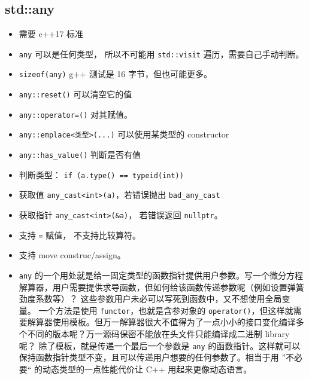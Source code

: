 \subsection{std::any}
\begin{itemize}
\item 需要 c++17 标准
\end{itemize}
\begin{itemize}
\item \verb|any| 可以是任何类型， 所以不可能用 \verb|std::visit| 遍历，需要自己手动判断。
\item \verb|sizeof(any)| g++ 测试是 16 字节，但也可能更多。
\item \verb|any::reset()| 可以清空它的值
\item \verb|any::operator=()| 对其赋值。
\item \verb|any::emplace<类型>(...)| 可以使用某类型的 constructor
\item \verb|any::has_value()| 判断是否有值
\item 判断类型： \verb|if (a.type() == typeid(int))|
\item 获取值 \verb|any_cast<int>(a)|，若错误抛出 \verb|bad_any_cast|
\item 获取指针 \verb|any_cast<int>(&a)|， 若错误返回 \verb|nullptr|。
\item 支持 \verb|=| 赋值， 不支持比较算符。
\item 支持 move construc/assign。
\item \verb|any| 的一个用处就是给一固定类型的函数指针提供用户参数。写一个微分方程解算器，用户需要提供求导函数，但如何给该函数传递参数呢（例如设置弹簧劲度系数等）？ 这些参数用户未必可以写死到函数中，又不想使用全局变量。 一个方法是使用 \verb|functor|，也就是含参对象的 \verb|operator()|，但这样就需要解算器使用模板。但万一解算器很大不值得为了一点小小的接口变化编译多个不同的版本呢？万一源码保密不能放在头文件只能编译成二进制 library 呢？ 除了模板，就是传递一个最后一个参数是 \verb|any| 的函数指针。这样就可以保持函数指针类型不变，且可以传递用户想要的任何参数了。相当于用 ”不必要“ 的动态类型的一点性能代价让 C++ 用起来更像动态语言。
\end{itemize}
